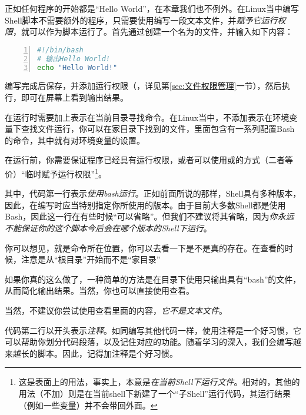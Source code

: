 正如任何程序的开始都是“Hello World”，在本章我们也不例外。在Linux当中编写Shell脚本不需要额外的程序，只需要使用编写一段文本文件，并\emph{赋予它运行权限}，就可以作为脚本运行了。首先通过创建一个名为的文件，并输入如下内容：

\begin{lstlisting}[language=bash,caption=hello,numbers=left]
#!/bin/bash
# 输出Hello World!
echo "Hello World!"
\end{lstlisting}

编写完成后保存，并添加运行权限（，详见第\ref{sec:文件权限管理}一节），然后执行，即可在屏幕上看到输出结果。

\begin{attention}
    在运行时需要加上表示在当前目录寻找命令。在Linux当中，不添加表示在环境变量下查找文件运行，你可以在家目录下找到的文件，里面包含有一系列配置Bash的命令，其中就有对环境变量的设置。

    在运行前，你需要保证程序已经具有运行权限，或者可以使用或的方式（二者等价）“临时赋予运行权限”\footnote{这是表面上的用法，事实上，本意是\emph{在当前Shell下运行文件}。相对的，其他的用法（不加）则是在当前shell下新建了一个“子Shell”运行代码，其运行结果（例如一些变量）并不会带回外面。}。
\end{attention}

其中，代码第一行表示\emph{使用bash运行}。正如前面所说的那样，Shell具有多种版本，因此，在编写时应当特别指定你所使用的版本。由于目前大多数Shell都是使用Bash，因此这一行在有些时候“可以省略”。但我们不建议将其省略，因为\emph{你永远不能保证你的这个脚本今后会在哪个版本的Shell下运行}。

\begin{extend}
    你可以想见，就是命令所在位置，你可以去看一下是不是真的存在。在查看的时候，注意是从“根目录”开始而不是“家目录”

    如果你真的这么做了，一种简单的方法是在目录下使用只输出具有“bash”的文件，从而简化输出结果。当然，你也可以直接使用查看。

    当然，不建议你尝试使用查看里面的内容，\emph{它不是文本文件}。
\end{extend}

代码第二行以\code{\#}开头表示\emph{注释}。如同编写其他代码一样，使用注释是一个好习惯，它可以帮助你划分代码段落，以及记住对应的功能。随着学习的深入，我们会编写越来越长的脚本。因此，记得加注释是个好习惯。

